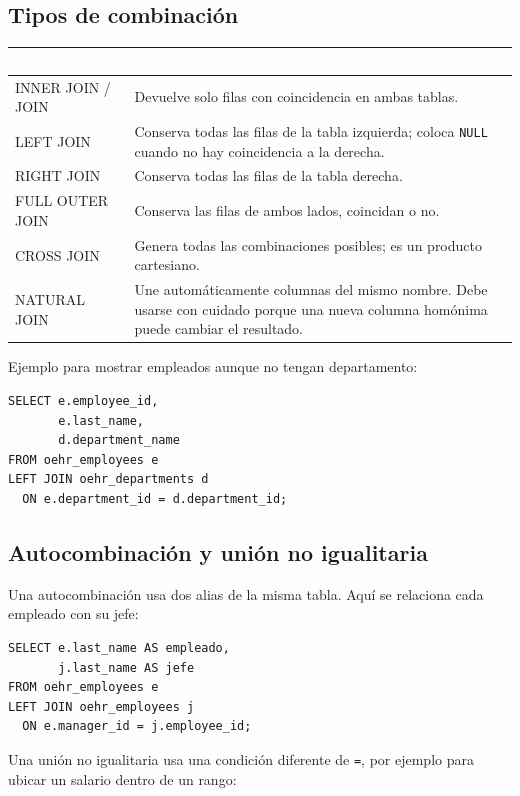 \documentclass[10pt,letterpaper]{article}
\begin{document}
\subsection{Tipos de combinación}

\begin{longtable}{>{\ttfamily}p{3.5cm} p{11.2cm}}
\toprule
\rowcolor{azulsql}
\normalfont\textcolor{white}{\textbf{Combinación}} &
\textcolor{white}{\textbf{Comportamiento}} \\
\midrule
\endhead
INNER JOIN / JOIN & Devuelve solo filas con coincidencia en ambas tablas. \\
LEFT JOIN & Conserva todas las filas de la tabla izquierda; coloca
\lstinline|NULL| cuando no hay coincidencia a la derecha. \\
RIGHT JOIN & Conserva todas las filas de la tabla derecha. \\
FULL OUTER JOIN & Conserva las filas de ambos lados, coincidan o no. \\
CROSS JOIN & Genera todas las combinaciones posibles; es un producto
cartesiano. \\
NATURAL JOIN & Une automáticamente columnas del mismo nombre. Debe usarse con
cuidado porque una nueva columna homónima puede cambiar el resultado. \\
\bottomrule
\end{longtable}

Ejemplo para mostrar empleados aunque no tengan departamento:

\begin{lstlisting}
SELECT e.employee_id,
       e.last_name,
       d.department_name
FROM oehr_employees e
LEFT JOIN oehr_departments d
  ON e.department_id = d.department_id;
\end{lstlisting}

\subsection{Autocombinación y unión no igualitaria}

Una autocombinación usa dos alias de la misma tabla. Aquí se relaciona cada
empleado con su jefe:

\begin{lstlisting}
SELECT e.last_name AS empleado,
       j.last_name AS jefe
FROM oehr_employees e
LEFT JOIN oehr_employees j
  ON e.manager_id = j.employee_id;
\end{lstlisting}

Una unión no igualitaria usa una condición diferente de \lstinline|=|, por
ejemplo para ubicar un salario dentro de un rango:
\end{document}
